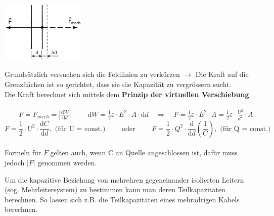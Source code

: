 \parbox{5cm}{\includegraphics[width=4cm]{./bilder/e-c-kraft.png}}
\parbox{13cm}{
	Grundsätzlich versuchen sich die Feldlinien zu verkürzen $\rightarrow$ Die Kraft auf die 	
	Grenzflächen ist so gerichtet, dass sie die Kapazität zu vergrössern sucht. \\	
	Die Kraft berechnet sich mittels dem \textbf{Prinzip der virtuellen Verschiebung}. \\ \\
	$\qquad F = F_{mech} = \left| \frac{\mathrm dW}{\mathrm dd} \right| \qquad$ 
	$\mathrm dW = \frac{1}{2} \varepsilon \cdot E^2 \cdot A \cdot \mathrm dd \quad 
	\Rightarrow \quad \boxed{ F = \frac{1}{2} 
	\varepsilon \cdot E^2 \cdot A = \frac{1}{2} \varepsilon \cdot \frac{U^2}{d^2} \cdot A}$ \\
	$$ F = \frac{1}{2} \cdot U^2 \cdot \frac{\mathrm dC}{\mathrm dd}, \text{ (für U = const.)} 
	\qquad \text{ oder } \qquad 
	F = \frac{1}{2} \cdot Q^2 \cdot \frac{\mathrm d}{\mathrm dd} \left( \frac{1}{C} \right), 	
	\text{ (für Q = const.)}$$
	\\ 
	Formeln für $F$ gelten auch, wenn C an Quelle angeschlossen ist, dafür muss jedoch $|F|$		
	genommen werden.} 


Um die kapazitive Beziehung von mehrehren gegeneinander isolierten Leitern (sog. Mehrleitersystem) zu bestimmen kann man deren 
Teilkapazitäten berechnen. So lassen sich z.B. die Teilkapazitäten eines mehradrigen Kabels berechnen. \\

